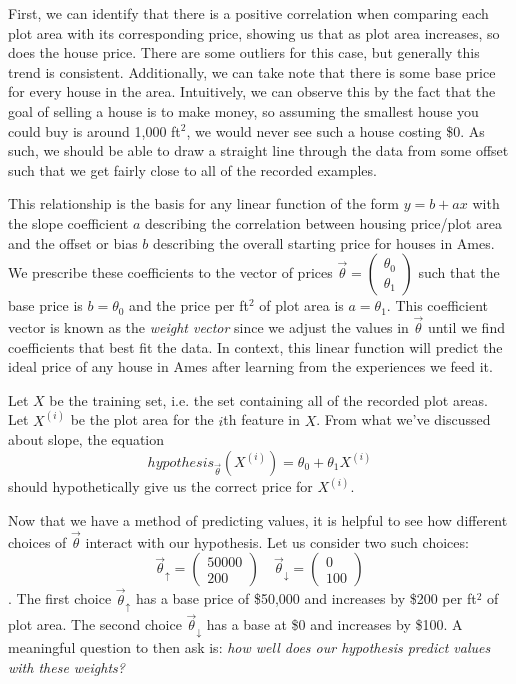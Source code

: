 First, we can identify that there is a positive correlation when comparing each
plot area with its corresponding price, showing us that as plot area increases,
so does the house price. There are some outliers for this case, but generally
this trend is consistent. Additionally, we can take note that there is some
base price for every house in the area. Intuitively, we can
observe this by the fact that the goal of selling a house is to make money, so
assuming the smallest house you could buy is around 1,000 ft$^2$, we would
never see such a house costing \$0. As such, we should be able to draw a
straight line through the data from some offset such that we get fairly close
to all of the recorded examples.

This relationship is the basis for any linear function of the form $y=b + ax$
with the slope coefficient $a$ describing the correlation between housing
price/plot area and the offset or bias $b$ describing the overall starting price for
houses in Ames. We prescribe these coefficients to the vector of prices $\vec\theta
= \begin{pmatrix}\theta_0 \\ \theta_1\end{pmatrix}$ such that the base price is
$b = \theta_0$ and the price per ft$^2$ of plot area is $a=\theta_1$. This
coefficient vector is known as the \emph{weight vector} since we adjust the
values in $\vec\theta$ until we find coefficients that best fit the data. In
context, this linear function will predict the ideal price of any house in
Ames after learning from the experiences we feed it.

Let $X$ be the training set, i.e. the set containing all of the
recorded plot areas. Let $X^{(i)}$ be the plot area for the $i$th feature in
$X$. From what we've discussed about slope, the equation
\begin{equation}
    hypothesis_{\vec\theta}(X^{(i)}) = \theta_0 + \theta_1X^{(i)}
\end{equation}
should hypothetically give us the correct price for $X^{(i)}$.

Now that we have a method of predicting values, it is helpful to see how different choices of $\vec\theta$ interact with our hypothesis. Let us consider two such choices:
\begin{equation*}
	\vec\theta_{\uparrow} = \begin{pmatrix}50000 \\ 200\end{pmatrix} \quad 	\vec\theta_{\downarrow} = \begin{pmatrix}0 \\ 100\end{pmatrix}
\end{equation*}
. The first choice $\vec\theta_{\uparrow}$ has a base price of \$50,000 and increases by \$200 per ft$^2$ of plot area. The second choice $\vec\theta_{\downarrow}$ has a base at \$0 and increases by \$100. A meaningful question to then ask is: \emph{how well does our hypothesis predict values with these weights?}

